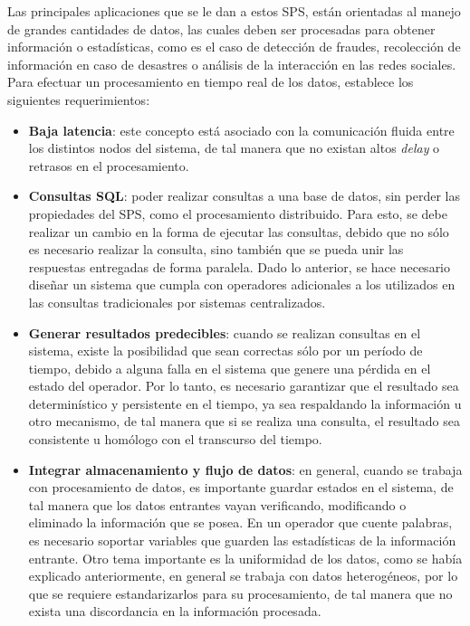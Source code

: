 Las principales aplicaciones que se le dan a estos SPS, están orientadas al manejo de grandes cantidades de datos, las cuales deben ser procesadas para obtener información o estadísticas, como es el caso de detección de fraudes, recolección de información en caso de desastres o análisis de la interacción en las redes sociales. Para efectuar un procesamiento en tiempo real de los datos, \citep{StonebrakerCZ05} establece los siguientes requerimientos:

\begin{itemize}
	\item \textbf{Baja latencia}: este concepto está asociado con la comunicación fluida entre los distintos nodos del sistema, de tal manera que no existan altos \textit{delay} o retrasos en el procesamiento.
	\item \textbf{Consultas SQL}: poder realizar consultas a una base de datos, sin perder las propiedades del SPS, como el procesamiento distribuido. Para esto, se debe realizar un cambio en la forma de ejecutar las consultas, debido que no sólo es necesario realizar la consulta, sino también que se pueda unir las respuestas entregadas de forma paralela. Dado lo anterior, se hace necesario diseñar un sistema que cumpla con operadores adicionales a los utilizados en las consultas tradicionales por sistemas centralizados.
	\item \textbf{Generar resultados predecibles}: cuando se realizan consultas en el sistema, existe la posibilidad que sean correctas sólo por un período de tiempo, debido a alguna falla en el sistema que genere una pérdida en el estado del operador. Por lo tanto, es necesario garantizar que el resultado sea determinístico y persistente en el tiempo, ya sea respaldando la información u otro mecanismo, de tal manera que si se realiza una consulta, el resultado sea consistente u homólogo con el transcurso del tiempo.
	\item \textbf{Integrar almacenamiento y flujo de datos}: en general, cuando se trabaja con procesamiento de datos, es importante guardar estados en el sistema, de tal manera que los datos entrantes vayan verificando, modificando o eliminado la información que se posea. En un operador que cuente palabras, es necesario soportar variables que guarden las estadísticas de la información entrante. Otro tema importante es la uniformidad de los datos, como se había explicado anteriormente, en general se trabaja con datos heterogéneos, por lo que se requiere estandarizarlos para su procesamiento, de tal manera que no exista una discordancia en la información procesada.

\end{itemize}
